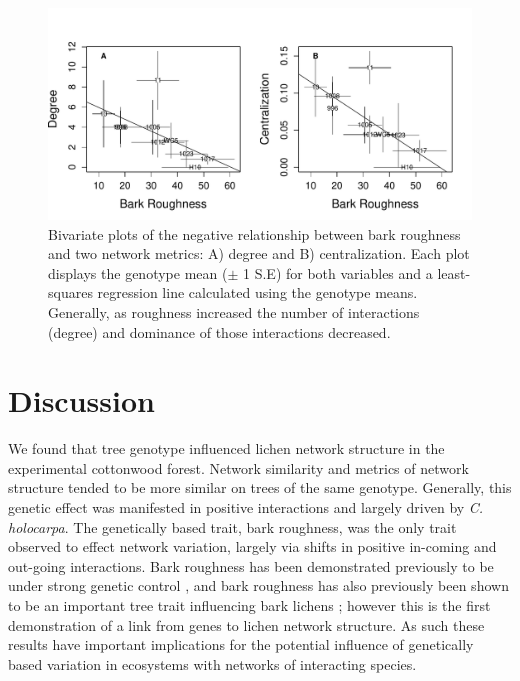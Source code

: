 \documentclass[11pt,twocolumn,twoside,lineno]{pnas-new}
\begin{document}
\begin{figure}[ht]
\centering
\includegraphics[width=\linewidth]{br_net.pdf}
\caption{Bivariate plots of the negative relationship between bark
  roughness and two network metrics: A) degree and B)
  centralization. Each plot displays the genotype mean ($\pm$ 1 S.E)
  for both variables and a least-squares regression line calculated
  using the genotype means. Generally, as roughness increased the
  number of interactions (degree) and dominance of
  those interactions decreased.}
\label{fig:br_net}
\end{figure}




\section*{Discussion}


We found that tree genotype influenced lichen network structure in the
experimental cottonwood forest. Network similarity and metrics of
network structure tended to be more similar on trees of the same
genotype. Generally, this genetic effect was manifested in positive
interactions and largely driven by \textit{C. holocarpa}. The
genetically based trait, bark roughness, was the only trait observed
to effect network variation, largely via shifts in positive in-coming
and out-going interactions. Bark roughness has been demonstrated
previously to be under strong genetic control \cite{Bdeir2017}, and
bark roughness has also previously been shown to be an important tree
trait influencing bark lichens \cite{Lamit2015a}; however this is the
first demonstration of a link from genes to lichen network structure.
As such these results have important implications for the potential
influence of genetically based variation in ecosystems with networks
of interacting species.
\end{document}
